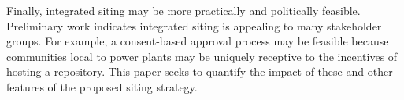 Finally, integrated siting may be more practically and politically feasible. 
Preliminary work \cite{waleed_regional_2015} indicates integrated siting is 
appealing to many stakeholder groups. For example, a consent-based approval 
process may be feasible because communities local to power plants may be 
uniquely receptive to the incentives of hosting a repository. This paper seeks to
 quantify the impact of these and other features of the proposed siting strategy. 




